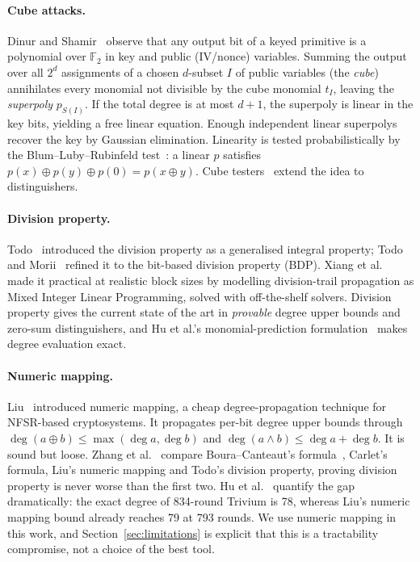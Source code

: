 \documentclass[11pt,a4paper]{article}
\theoremstyle{plain}
\theoremstyle{definition}
\theoremstyle{remark}
\newcommand{\FF}{\mathbb{F}}
\begin{document}
\paragraph{Cube attacks.} Dinur and Shamir~\cite{cube09} observe that any output bit
of a keyed primitive is a polynomial over $\FF_2$ in key and public (IV/nonce)
variables. Summing the output over all $2^d$ assignments of a chosen $d$-subset $I$ of
public variables (the \emph{cube}) annihilates every monomial not divisible by the
cube monomial $t_I$, leaving the \emph{superpoly} $p_{S(I)}$. If the total degree is
at most $d+1$, the superpoly is linear in the key bits, yielding a free linear
equation. Enough independent linear superpolys recover the key by Gaussian
elimination. Linearity is tested probabilistically by the Blum--Luby--Rubinfeld
test~\cite{blr}: a linear $p$ satisfies $p(x)\oplus p(y)\oplus p(0) = p(x\oplus y)$.
Cube testers~\cite{cubetesters} extend the idea to distinguishers.

\paragraph{Division property.} Todo~\cite{todo15} introduced the division property as
a generalised integral property; Todo and Morii~\cite{todo16} refined it to the
bit-based division property (BDP). Xiang et al.~\cite{xiang16} made it practical at
realistic block sizes by modelling division-trail propagation as Mixed Integer Linear
Programming, solved with off-the-shelf solvers. Division property gives the current
state of the art in \emph{provable} degree upper bounds and zero-sum
distinguishers, and Hu et al.'s monomial-prediction
formulation~\cite{hu20} makes degree evaluation exact.

\paragraph{Numeric mapping.} Liu~\cite{liu17} introduced numeric mapping, a cheap
degree-propagation technique for NFSR-based cryptosystems. It propagates per-bit
degree upper bounds through $\deg(a\oplus b)\le\max(\deg a,\deg b)$ and
$\deg(a\wedge b)\le \deg a + \deg b$. It is sound but loose. Zhang et
al.~\cite{zhang21} compare Boura--Canteaut's formula~\cite{boura11}, Carlet's formula,
Liu's numeric mapping and Todo's division property, proving division property is never
worse than the first two. Hu et al.~\cite{hu20} quantify the gap dramatically: the
exact degree of 834-round Trivium is 78, whereas Liu's numeric mapping bound already
reaches 79 at 793 rounds. We use numeric mapping in this work, and
Section~\ref{sec:limitations} is explicit that this is a tractability compromise, not
a choice of the best tool.
\end{document}
